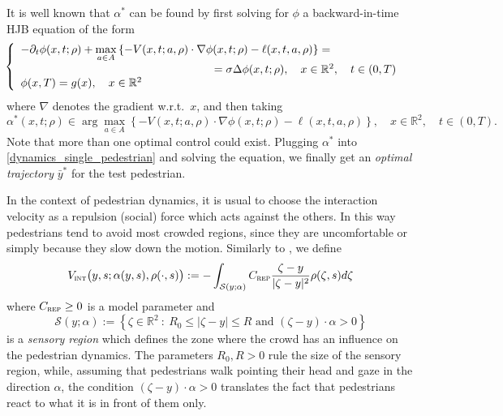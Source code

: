 \documentclass{cmslatex}
\newcommand{\R}{\mathbb{R}}
\newcommand{\alphastar}{\alpha^*}
\newcommand{\Vi}{V_\textsc{int}}
\renewcommand{\r}{\rho}
\begin{document}
It is well known \cite[Rem.\ 3.10]{bardibook} that $\alphastar$ can be found by first solving for $\phi$ a backward-in-time HJB equation of the form
\begin{equation}\label{HJB-orizzontefinito}
\hspace{-0.4cm}\left\{\begin{array}{l}
-\partial_t\phi(x,t;\r) + \max\limits_{a\in A}\left\{-V(x,t;a,\r)\cdot\nabla\phi(x,t;\r)-\ell(x,t,a,\r)\right\}=\\ [2mm] \hspace{6cm} 
=\sigma\Delta\phi(x,t;\r),\quad x\in\R^2, \quad t\in (0,T) \\ [0mm]
\phi(x,T)=g(x),\quad x\in\R^2
\end{array}\right.
\end{equation}
where $\nabla$ denotes the gradient w.r.t.\ $x$, and then taking %
\begin{equation}\label{synthesis}
\alphastar(x,t;\r)\in\arg\max\limits_{a\in A}\left\{-V(x,t;a,\r)\cdot\nabla\phi(x,t;\r)-\ell(x,t,a,\r)\right\},\quad x\in\R^2, \quad t\in (0,T).
\end{equation}
Note that more than one optimal control could exist. 
Plugging $\alpha^*$ into \eqref{dynamics_single_pedestrian} and solving the equation, we finally get an \textit{optimal trajectory} $\bar y^*$ for the test pedestrian. 

\medskip

In the context of pedestrian dynamics, it is usual to choose the interaction velocity as a repulsion (social) force which acts against the others. 
In this way pedestrians tend to avoid most crowded regions, since they are uncomfortable or simply because they slow down the motion. 
Similarly to \cite{cristiani2015SIAP}, we define
\begin{equation}\label{def:Vint}
\Vi\big(y,s;\alpha(y,s),\r(\cdot,s)\big):=-\int_{\mathcal S(y;\alpha)}C_\textsc{rep}\frac{\zeta-y}{|\zeta-y|^2} \r(\zeta,s)d\zeta
\end{equation} 
where $C_\textsc{rep}\geq 0$ is a model parameter and
\begin{equation}\label{def:sensoryregion}
\mathcal S(y;\alpha):=\left\{\zeta\in\R^2 \ : \ R_0\leq|\zeta-y|\leq R \text{ and } (\zeta-y)\cdot\alpha>0 \right\}
\end{equation}
is a \textit{sensory region} which defines the zone where the crowd has an influence on the pedestrian dynamics. 
The parameters $R_0, R>0$ rule the size of the sensory region, while, assuming that pedestrians walk pointing their head and gaze in the direction $\alpha$, the condition $(\zeta-y)\cdot\alpha>0$ translates the fact that pedestrians react to what it is in front of them only.
\end{document}
